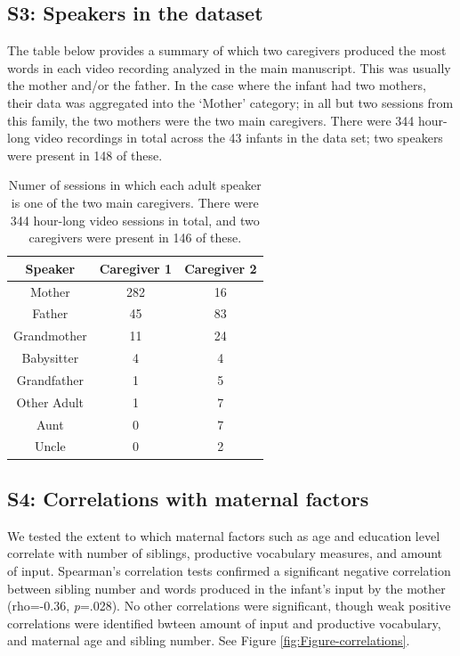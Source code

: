 \documentclass[
  man,mask,floatsintext]{apa6}
\begin{document}
\hypertarget{s3-speakers-in-the-dataset}{%
\subsection{S3: Speakers in the dataset}\label{s3-speakers-in-the-dataset}}

The table below provides a summary of which two caregivers produced the most words in each video recording analyzed in the main manuscript. This was usually the mother and/or the father. In the case where the infant had two mothers, their data was aggregated into the `Mother' category; in all but two sessions from this family, the two mothers were the two main caregivers. There were 344 hour-long video recordings in total across the 43 infants in the data set; two speakers were present in 148 of these.

\begin{longtable}[t]{ccc}
\caption{\label{tab:table-speakers-sessions}Numer of sessions in which each adult speaker is one of the two main caregivers. There were 344 hour-long video sessions in total, and two caregivers were present in 146 of these.}\\
\toprule
Speaker & Caregiver 1 & Caregiver 2\\
\midrule
Mother & 282 & 16\\
Father & 45 & 83\\
Grandmother & 11 & 24\\
Babysitter & 4 & 4\\
Grandfather & 1 & 5\\
\addlinespace
Other Adult & 1 & 7\\
Aunt & 0 & 7\\
Uncle & 0 & 2\\
\bottomrule
\end{longtable}

\newpage

\hypertarget{s4-correlations-with-maternal-factors}{%
\subsection{S4: Correlations with maternal factors}\label{s4-correlations-with-maternal-factors}}

We tested the extent to which maternal factors such as age and education level correlate with number of siblings, productive vocabulary measures, and amount of input. Spearman's correlation tests confirmed a significant negative correlation between sibling number and words produced in the infant's input by the mother (rho=-0.36, \emph{p}=.028). No other correlations were significant, though weak positive correlations were identified bwteen amount of input and productive vocabulary, and maternal age and sibling number. See Figure \ref{fig:Figure-correlations}.
\end{document}
